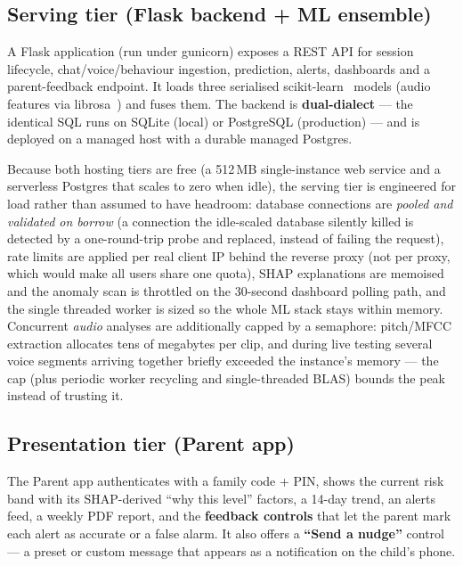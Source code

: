 \documentclass[11pt,a4paper]{article}
\begin{document}
\subsection{Serving tier (Flask backend + ML ensemble)}
A Flask application (run under gunicorn) exposes a REST API for session lifecycle,
chat/voice/behaviour ingestion, prediction, alerts, dashboards and a parent-feedback
endpoint. It loads three serialised scikit-learn~\cite{sklearn2011} models (audio
features via librosa~\cite{librosa2015}) and fuses them. The backend
is \textbf{dual-dialect} --- the identical SQL runs on SQLite (local) or PostgreSQL
(production) --- and is deployed on a managed host with a durable managed Postgres.

Because both hosting tiers are free (a 512\,MB single-instance web service and a
serverless Postgres that scales to zero when idle), the serving tier is engineered
for load rather than assumed to have headroom: database connections are
\emph{pooled and validated on borrow} (a connection the idle-scaled database silently
killed is detected by a one-round-trip probe and replaced, instead of failing the
request), rate limits are applied per real client IP behind the reverse proxy (not per
proxy, which would make all users share one quota), SHAP explanations are memoised and
the anomaly scan is throttled on the 30-second dashboard polling path, and the single
threaded worker is sized so the whole ML stack stays within memory. Concurrent
\emph{audio} analyses are additionally capped by a semaphore: pitch/MFCC extraction
allocates tens of megabytes per clip, and during live testing several voice segments
arriving together briefly exceeded the instance's memory --- the cap (plus periodic
worker recycling and single-threaded BLAS) bounds the peak instead of trusting it.

\subsection{Presentation tier (Parent app)}
The Parent app authenticates with a family code + PIN, shows the current risk band
with its SHAP-derived ``why this level'' factors, a 14-day trend, an alerts feed, a
weekly PDF report, and the \textbf{feedback controls} that let the parent mark each
alert as accurate or a false alarm. It also offers a \textbf{``Send a nudge''} control
--- a preset or custom message that appears as a notification on the child's phone.
\end{document}
